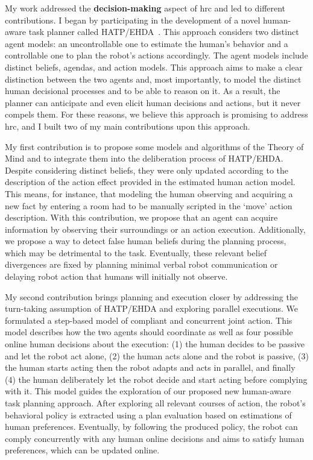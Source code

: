 
My work addressed the \textbf{decision-making} aspect of \acrshort{hrc} and led to different contributions.
I began by participating in the development of a novel human-aware task planner called HATP/EHDA~\cite{buisan_hatpehda_icra}. This approach considers two distinct agent models: an uncontrollable one to estimate the human's behavior and a controllable one to plan the robot's actions accordingly. The agent models include distinct beliefs, agendas, and action models. This approach aims to make a clear distinction between the two agents and, most importantly, to model the distinct human decisional processes and to be able to reason on it. As a result, the planner can anticipate and even elicit human decisions and actions, but it never compels them. For these reasons, we believe this approach is promising to address \acrshort{hrc}, and I built two of my main contributions upon this approach.

My first contribution is to propose some models and algorithms of the Theory of Mind and to integrate them into the deliberation process of HATP/EHDA. Despite considering distinct beliefs, they were only updated according to the description of the action effect provided in the estimated human action model. This means, for instance, that modeling the human observing and acquiring a new fact by entering a room had to be manually scripted in the `move' action description. With this contribution, we propose that an agent can acquire information by observing their surroundings or an action execution. Additionally, we propose a way to detect false human beliefs during the planning process, which may be detrimental to the task. Eventually, these relevant belief divergences are fixed by planning minimal verbal robot communication or delaying robot action that humans will initially not observe.

My second contribution brings planning and execution closer by addressing the turn-taking assumption of HATP/EHDA and exploring parallel executions. We formulated a step-based model of compliant and concurrent joint action. This model describes how the two agents should coordinate as well as four possible online human decisions about the execution: (1) the human decides to be passive and let the robot act alone, (2) the human acts alone and the robot is passive, (3) the human starts acting then the robot adapts and acts in parallel, and finally (4) the human deliberately let the robot decide and start acting before complying with it. This model guides the exploration of our proposed new human-aware task planning approach. After exploring all relevant courses of action, the robot's behavioral policy is extracted using a plan evaluation based on estimations of human preferences. Eventually, by following the produced policy, the robot can comply concurrently with any human online decisions and aims to satisfy human preferences, which can be updated online.


